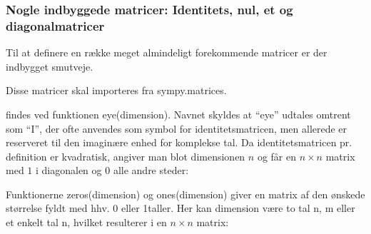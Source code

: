\documentclass[letterpaper,10pt,english]{jupyterBook}
\begin{document}
\begin{sphinxVerbatim}[commandchars=\\\{\}]
  
\end{sphinxVerbatim}

\noindent{}


\subsubsection{Nogle indbyggede matricer: Identitets\sphinxhyphen{}, nul\sphinxhyphen{}, et\sphinxhyphen{} og diagonalmatricer}
\label{\detokenize{notebooks/sympy/Notebook_LinAlg1:nogle-indbyggede-matricer-identitets-nul-et-og-diagonalmatricer}}
Til at definere en række meget almindeligt forekommende matricer er der indbygget smutveje.

Disse matricer skal importeres fra sympy.matrices.

 findes ved funktionen eye(dimension). Navnet skyldes at “eye” udtales omtrent som “I”, der ofte anvendes som symbol for identitetsmatricen, men allerede er reserveret til den imaginære enhed for komplekse tal. Da identitetsmatricen pr. definition er kvadratisk, angiver man blot dimensionen \(n\) og får en \(n\times n\) matrix med \(1\) i diagonalen og \(0\) alle andre steder:

\begin{sphinxVerbatim}[commandchars=\\\{\}]
   

  
\end{sphinxVerbatim}

\noindent{}

 Funktionerne zeros(dimension) og ones(dimension) giver en matrix af den ønskede størrelse fyldt med hhv. 0 eller 1\sphinxhyphen{}taller. Her kan dimension være to tal n, m eller et enkelt tal n, hvilket resulterer i en \(n \times n\) matrix:

\begin{sphinxVerbatim}[commandchars=\\\{\}]
    

  
\end{sphinxVerbatim}
\end{document}

